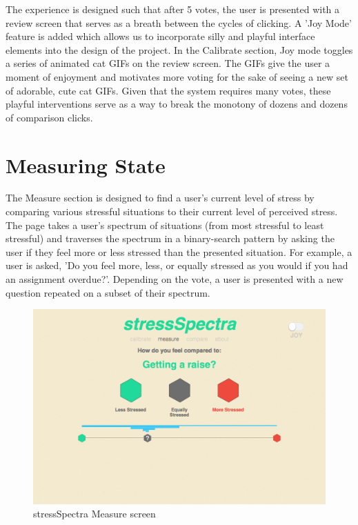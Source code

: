 \documentclass{sigchi}
\begin{document}
The experience is designed such that after 5 votes, the user is presented with a review screen that serves as a breath between the cycles of clicking. A 'Joy Mode' feature is added which allows us to incorporate silly and playful interface elements into the design of the project. In the Calibrate section, Joy mode toggles a series of animated cat GIFs on the review screen. The GIFs give the user a moment of enjoyment and motivates more voting for the sake of seeing a new set of adorable, cute cat GIFs. Given that the system requires many votes, these playful interventions serve as a way to break the monotony of dozens and dozens of comparison clicks.

\section{Measuring State}
The Measure section is designed to find a user's current level of stress by comparing various stressful situations to their current level of perceived stress. The page takes a user's spectrum of situations (from most stressful to least stressful) and traverses the spectrum in a binary-search pattern by asking the user if they feel more or less stressed than the presented situation. For example, a user is asked, 'Do you feel more, less, or equally stressed as you would if you had an assignment overdue?'. Depending on the vote, a user is presented with a new question repeated on a subset of their spectrum.
\begin{figure}[!h]
\centering
\includegraphics[width=0.9\columnwidth]{measure1}
\caption{stressSpectra Measure screen}
\label{fig:calibrate}
\end{figure}
\end{document}
